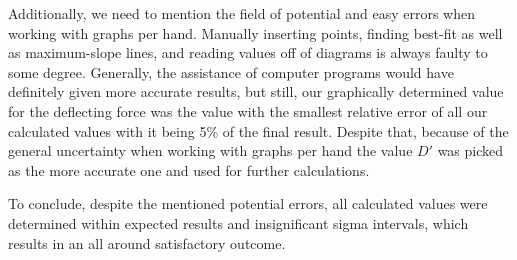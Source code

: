 \documentclass{article}
\begin{document}
Additionally, we need to mention the field of potential and easy errors when working with graphs per hand. Manually inserting points, finding best-fit as well as maximum-slope lines, and reading values off of diagrams is always faulty to some degree. Generally, the assistance of computer programs would have definitely given more accurate results, but still, our graphically determined value for the deflecting force was the value with the smallest relative error of all our calculated values with it being 5\% of the final result. Despite that, because of the general uncertainty when working with graphs per hand the value $D'$ was picked as the more accurate one and used for further calculations.

To conclude, despite the mentioned potential errors, all calculated values were determined within expected results and insignificant sigma intervals, which results in an all around satisfactory outcome.
\end{document}
